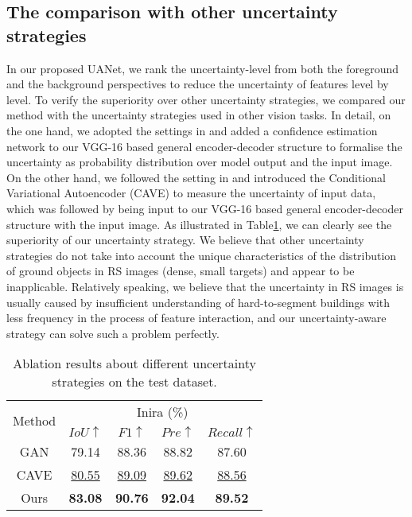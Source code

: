 \documentclass[lettersize,journal]{IEEEtran}
\begin{document}
\subsection{The comparison with other uncertainty strategies}
In our proposed UANet, we rank the uncertainty-level from both the foreground and the background perspectives to reduce the uncertainty of features level by level. To verify the superiority over other uncertainty strategies, we compared our method with the uncertainty strategies used in other vision tasks. In detail, on the one hand, we adopted the settings in \cite{aleatoric_uncertainty} and added a confidence estimation network to our VGG-16 based general encoder-decoder structure to formalise the uncertainty as probability distribution over model output and the input image. On the other hand, we followed the setting in \cite{CVAE_COD} and introduced the Conditional Variational Autoencoder (CAVE) to measure the uncertainty of input data, which was followed by being input to our VGG-16 based general encoder-decoder structure with the input image. As illustrated in Table\ref{tab:table_us}, we can clearly see the superiority of our uncertainty strategy. We believe that other uncertainty strategies do not take into account the unique characteristics of the distribution of ground objects in RS images (dense, small targets) and appear to be inapplicable. Relatively speaking, we believe that the uncertainty in RS images is usually caused by insufficient understanding of hard-to-segment buildings with less frequency in the process of feature interaction, and our uncertainty-aware strategy can solve such a problem perfectly.






\begin{table}[]
\normalsize
\setlength\tabcolsep{3pt}
\caption{Ablation results about different uncertainty strategies on the test dataset.}
\label{tab:table_us}
\center
\begin{tabular}{c|cccc}
\hline
\multirow{2}{*}{Method} &\multicolumn{4}{c}{Inira (\%)}                                             
 \\ \cline{2-5} 
 & $IoU\uparrow$ & $F1\uparrow$ & $Pre\uparrow$ & $Recall\uparrow$ \\ \hline
GAN&
79.14	&88.36	&88.82	&87.60\\ 
CAVE &
\underline{80.55}	&\underline{89.09}	&\underline{89.62}	&\underline{88.56}\\ 
Ours &
\color{red}\textbf{83.08}  &\color{red}\textbf{90.76} &\color{red}\textbf{92.04} &\color{red}\textbf{89.52}
\\ \hline
\end{tabular}
\end{table}
\end{document}

